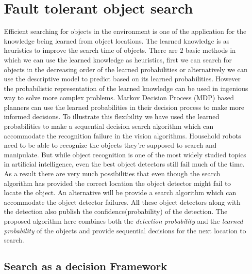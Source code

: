 \documentclass[11pt]{book}
\begin{document}
\chapter{Fault tolerant object search}
\label{cha}

Efficient searching for objects in the environment is one of the application for the knowledge being learned from object locations. The learned knowledge is as heuristics to improve the search time of objects. There are 2 basic methods in which we can use the learned knowledge as heuristics, first we can search for objects in the decreasing order of the learned probabilities or alternatively we can use the descriptive model to predict based on its learned probabilities. However the probabilistic representation of the learned knowledge can be used in ingenious way to solve more complex problems. Markov Decision Process (MDP) based planners can use the learned probabilities in their decision process to make more informed decisions. To illustrate this flexibility we have used the learned probabilities to make a sequential decision search algorithm which can accommodate the recognition failure in the vision algorithms.
Household robots need to be able to recognize the objects they’re supposed to search and manipulate. But while object recognition is one of the most widely studied topics in artificial intelligence, even the best object detectors still fail much of the time. As a result there are very much possibilities that even though the search algorithm has provided the correct location the object detector might fail to locate the object. An alternative will be provide a search algorithm which can accommodate the object detector failures. All these object detectors along with the detection also publish the confidence(probability) of the detection. The proposed algorithm here combines both the \emph{detection probability} and the \emph{learned probability} of the objects and provide sequential decisions for the next location to search.

\section{Search as a decision Framework}
\end{document}
